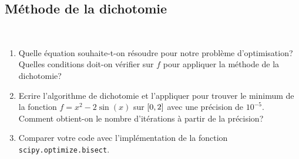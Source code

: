
\subsection{Méthode de la dichotomie}\label{exo:1}

\begin{td-exo}\,
    \begin{enumerate}
        \item Quelle équation souhaite-t-on résoudre pour notre problème d'optimisation?
        Quelles conditions doit-on vérifier sur \(f\) pour appliquer la méthode de la dichotomie?
    
        \item Ecrire l'algorithme de dichotomie et l'appliquer pour trouver le minimum de la fonction
        \(f = x^2 - 2\sin(x)\) sur \(\mathopen{}\left[0,2\right]\mathclose{}\) avec une précision de \(10^{-5}\).
        Comment obtient-on le nombre d'itérations à partir de la précision?
    
        \item Comparer votre code avec l'implémentation de la fonction \texttt{scipy.optimize.bisect}.
    \end{enumerate}
\end{td-exo}


